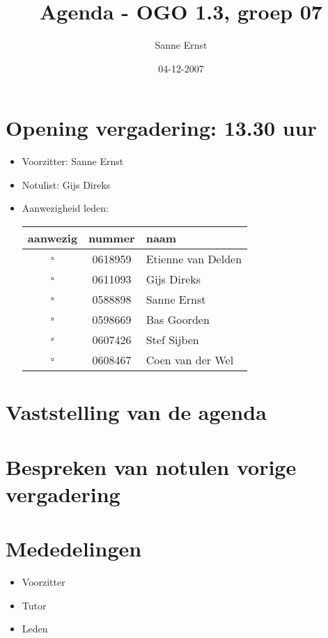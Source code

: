 \documentclass[]{article}
\title{Agenda - OGO 1.3, groep 07 }
\author{ Sanne Ernst }
\date{04-12-2007}
\begin{document}
\maketitle


\section{Opening vergadering: 13.30 uur }
  \begin{itemize}
    \item Voorzitter: Sanne Ernst
    \item Notulist: Gijs Direks
    \item Aanwezigheid leden:

    \begin{tabular}{c | c | l}
      aanwezig & nummer & naam \\
      \hline
      $\square$ & 0618959 & Etienne van Delden \\
      $\square$ & 0611093 & Gijs Direks \\
      $\square$ & 0588898 & Sanne Ernst \\
      $\square$ & 0598669 & Bas Goorden \\
      $\square$ & 0607426 & Stef Sijben\\
      $\square$ & 0608467 & Coen van der Wel \\

    \end{tabular}

  \end{itemize}

\section{Vaststelling van de agenda}

\section{Bespreken van notulen vorige vergadering}


 \section{Mededelingen}
 \begin{itemize}
   \item Voorzitter
   \item Tutor
   \item Leden
 \end{itemize}
\end{document}
